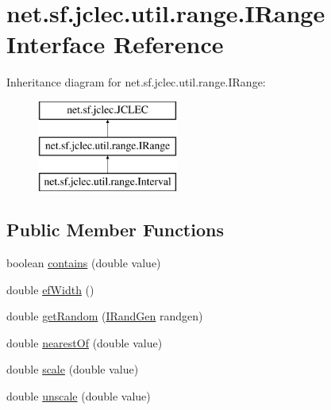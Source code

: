\hypertarget{interfacenet_1_1sf_1_1jclec_1_1util_1_1range_1_1_i_range}{\section{net.\-sf.\-jclec.\-util.\-range.\-I\-Range Interface Reference}
\label{interfacenet_1_1sf_1_1jclec_1_1util_1_1range_1_1_i_range}
}
Inheritance diagram for net.\-sf.\-jclec.\-util.\-range.\-I\-Range\-:\begin{figure}[H]
\begin{center}
\leavevmode
\includegraphics[height=3.000000cm]{interfacenet_1_1sf_1_1jclec_1_1util_1_1range_1_1_i_range}
\end{center}
\end{figure}
\subsection*{Public Member Functions}
\begin{DoxyCompactItemize}
\item 
boolean \hyperlink{interfacenet_1_1sf_1_1jclec_1_1util_1_1range_1_1_i_range_ac7a975f941b73f87bc7d3a4805a43edf}{contains} (double value)
\item 
double \hyperlink{interfacenet_1_1sf_1_1jclec_1_1util_1_1range_1_1_i_range_ade59cc10b65395811df1a749cd9e48c3}{ef\-Width} ()
\item 
double \hyperlink{interfacenet_1_1sf_1_1jclec_1_1util_1_1range_1_1_i_range_a27a382f354d817eb903da4cd4ff86e09}{get\-Random} (\hyperlink{interfacenet_1_1sf_1_1jclec_1_1util_1_1random_1_1_i_rand_gen}{I\-Rand\-Gen} randgen)
\item 
double \hyperlink{interfacenet_1_1sf_1_1jclec_1_1util_1_1range_1_1_i_range_a11c7b1826237eb8b886d8ae9c2a65b87}{nearest\-Of} (double value)
\item 
double \hyperlink{interfacenet_1_1sf_1_1jclec_1_1util_1_1range_1_1_i_range_a46de0f42118c17caae262323209d5db1}{scale} (double value)
\item 
double \hyperlink{interfacenet_1_1sf_1_1jclec_1_1util_1_1range_1_1_i_range_a13624d52844618f5058e1ff3b9b65fbc}{unscale} (double value)
\end{DoxyCompactItemize}


